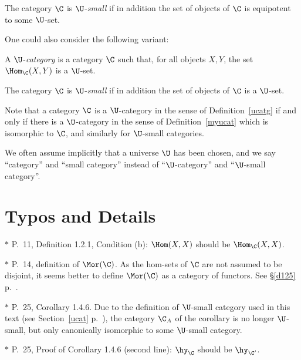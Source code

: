 \documentclass[12pt]{article}
\theoremstyle{remark}
\theoremstyle{definition}
\begin{document}
\begin{df} 
The category $\C$ is $\U$-{\em small} if in addition the set of objects of $\C$ is equipotent to some $\U$-set. 
\end{df} 

One could also consider the following variant: 

\begin{df}[$\U$-category] 
A $\U$-{\em category} is a category $\C$ such that, for all objects $X,Y$, the set $\Hom_\C(X,Y)$ is a $\U$-set. 
\end{df} 

\begin{df}
The category $\C$ is $\U$-{\em small} if in addition the set of objects of $\C$ is a $\U$-set. 
\end{df} 

Note that a category $\C$ is a $\U$-category in the sense of Definition~\ref{ucatg} if and only if there is a $\U$-category in the sense of Definition~\ref{myucat} which is isomorphic to $\C$, and similarly for $\U$-small categories. 
\begin{center}
\end{center}

We often assume implicitly that a universe $\U$ has been chosen, and we say ``category'' and ``small category'' instead of ``$\U$-category'' and ``$\U$-small category''.


\section{Typos and Details}

$*$ P.~11, Definition 1.2.1, Condition (b): $\Hom(X,X)$ should be $\Hom_{\C}(X,X)$. 

\nn$*$ P.~14, definition of $\Mor(\C)$. As the hom-sets of $\C$ are not assumed to be disjoint, it seems better to define $\Mor(\C)$ as a category of functors. See \S\ref{d125} p.~. 

\nn$*$ P.~25, Corollary 1.4.6. Due to the definition of $\U$-small category used in this text (see Section~\ref{ucat} p.~), the category $\C_A$ of the corollary is no longer $\U$-small, but only canonically isomorphic to some $\U$-small category. 

\nn$*$ P.~25, Proof of Corollary 1.4.6 (second line): $\hy_\C$ should be $\hy_{\C'}$.
\end{document}
